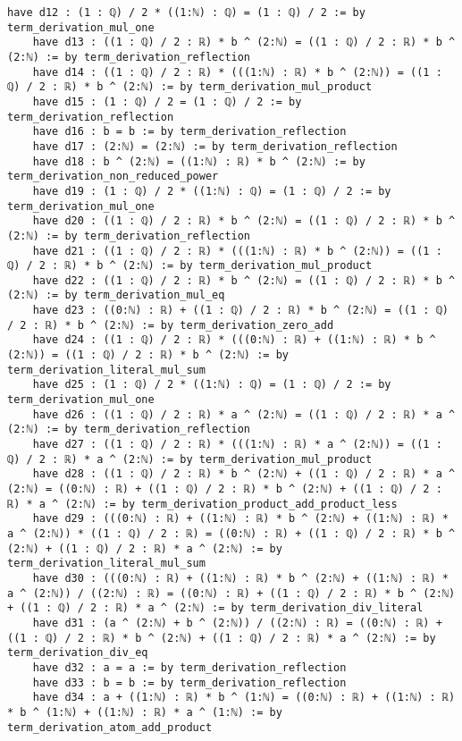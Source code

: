 \documentclass{article}
\begin{document}
\begin{tcolorbox}[colback=white!10, width=\linewidth]
\begin{lstlisting}[language=Lean4]
    have d12 : (1 : ℚ) / 2 * ((1:ℕ) : ℚ) = (1 : ℚ) / 2 := by term_derivation_mul_one
    have d13 : ((1 : ℚ) / 2 : ℝ) * b ^ (2:ℕ) = ((1 : ℚ) / 2 : ℝ) * b ^ (2:ℕ) := by term_derivation_reflection
    have d14 : ((1 : ℚ) / 2 : ℝ) * (((1:ℕ) : ℝ) * b ^ (2:ℕ)) = ((1 : ℚ) / 2 : ℝ) * b ^ (2:ℕ) := by term_derivation_mul_product
    have d15 : (1 : ℚ) / 2 = (1 : ℚ) / 2 := by term_derivation_reflection
    have d16 : b = b := by term_derivation_reflection
    have d17 : (2:ℕ) = (2:ℕ) := by term_derivation_reflection
    have d18 : b ^ (2:ℕ) = ((1:ℕ) : ℝ) * b ^ (2:ℕ) := by term_derivation_non_reduced_power
    have d19 : (1 : ℚ) / 2 * ((1:ℕ) : ℚ) = (1 : ℚ) / 2 := by term_derivation_mul_one
    have d20 : ((1 : ℚ) / 2 : ℝ) * b ^ (2:ℕ) = ((1 : ℚ) / 2 : ℝ) * b ^ (2:ℕ) := by term_derivation_reflection
    have d21 : ((1 : ℚ) / 2 : ℝ) * (((1:ℕ) : ℝ) * b ^ (2:ℕ)) = ((1 : ℚ) / 2 : ℝ) * b ^ (2:ℕ) := by term_derivation_mul_product
    have d22 : ((1 : ℚ) / 2 : ℝ) * b ^ (2:ℕ) = ((1 : ℚ) / 2 : ℝ) * b ^ (2:ℕ) := by term_derivation_mul_eq
    have d23 : ((0:ℕ) : ℝ) + ((1 : ℚ) / 2 : ℝ) * b ^ (2:ℕ) = ((1 : ℚ) / 2 : ℝ) * b ^ (2:ℕ) := by term_derivation_zero_add
    have d24 : ((1 : ℚ) / 2 : ℝ) * (((0:ℕ) : ℝ) + ((1:ℕ) : ℝ) * b ^ (2:ℕ)) = ((1 : ℚ) / 2 : ℝ) * b ^ (2:ℕ) := by term_derivation_literal_mul_sum
    have d25 : (1 : ℚ) / 2 * ((1:ℕ) : ℚ) = (1 : ℚ) / 2 := by term_derivation_mul_one
    have d26 : ((1 : ℚ) / 2 : ℝ) * a ^ (2:ℕ) = ((1 : ℚ) / 2 : ℝ) * a ^ (2:ℕ) := by term_derivation_reflection
    have d27 : ((1 : ℚ) / 2 : ℝ) * (((1:ℕ) : ℝ) * a ^ (2:ℕ)) = ((1 : ℚ) / 2 : ℝ) * a ^ (2:ℕ) := by term_derivation_mul_product
    have d28 : ((1 : ℚ) / 2 : ℝ) * b ^ (2:ℕ) + ((1 : ℚ) / 2 : ℝ) * a ^ (2:ℕ) = ((0:ℕ) : ℝ) + ((1 : ℚ) / 2 : ℝ) * b ^ (2:ℕ) + ((1 : ℚ) / 2 : ℝ) * a ^ (2:ℕ) := by term_derivation_product_add_product_less
    have d29 : (((0:ℕ) : ℝ) + ((1:ℕ) : ℝ) * b ^ (2:ℕ) + ((1:ℕ) : ℝ) * a ^ (2:ℕ)) * ((1 : ℚ) / 2 : ℝ) = ((0:ℕ) : ℝ) + ((1 : ℚ) / 2 : ℝ) * b ^ (2:ℕ) + ((1 : ℚ) / 2 : ℝ) * a ^ (2:ℕ) := by term_derivation_literal_mul_sum
    have d30 : (((0:ℕ) : ℝ) + ((1:ℕ) : ℝ) * b ^ (2:ℕ) + ((1:ℕ) : ℝ) * a ^ (2:ℕ)) / ((2:ℕ) : ℝ) = ((0:ℕ) : ℝ) + ((1 : ℚ) / 2 : ℝ) * b ^ (2:ℕ) + ((1 : ℚ) / 2 : ℝ) * a ^ (2:ℕ) := by term_derivation_div_literal
    have d31 : (a ^ (2:ℕ) + b ^ (2:ℕ)) / ((2:ℕ) : ℝ) = ((0:ℕ) : ℝ) + ((1 : ℚ) / 2 : ℝ) * b ^ (2:ℕ) + ((1 : ℚ) / 2 : ℝ) * a ^ (2:ℕ) := by term_derivation_div_eq
    have d32 : a = a := by term_derivation_reflection
    have d33 : b = b := by term_derivation_reflection
    have d34 : a + ((1:ℕ) : ℝ) * b ^ (1:ℕ) = ((0:ℕ) : ℝ) + ((1:ℕ) : ℝ) * b ^ (1:ℕ) + ((1:ℕ) : ℝ) * a ^ (1:ℕ) := by term_derivation_atom_add_product

\end{lstlisting}
\end{tcolorbox}
\end{document}
